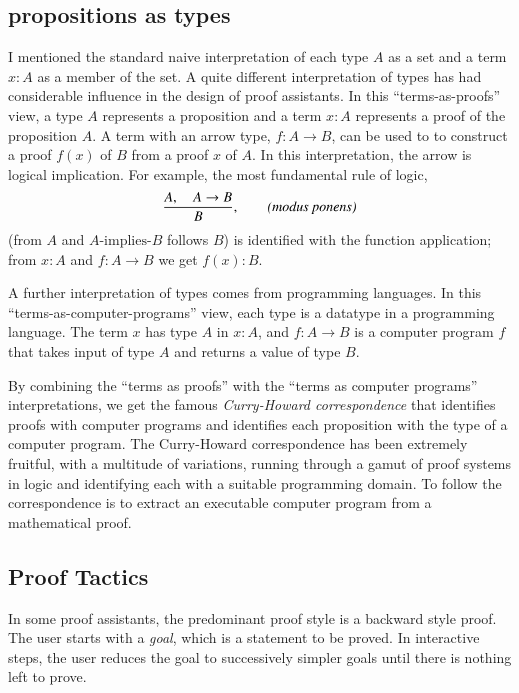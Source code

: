 \documentclass{llncs}
\begin{document}
\subsection{propositions as types}

I mentioned the standard naive interpretation of each type $A$ as a
set and a term $x:A$ as a member of the set.  A quite different
interpretation of types has had considerable influence in the design
of proof assistants.  In this ``terms-as-proofs'' view, a type $A$ represents a
proposition and a term $x:A$ represents a proof of the proposition
$A$.  A term with an arrow type, $f:A\rightarrow B$, can be used to to
construct a proof $f(x)$ of $B$ from a proof $x$ of $A$.  In this
interpretation, the arrow is logical implication. For example,  the most fundamental rule of logic,
\[
\frac{A,\quad A\rightarrow B}{B},  \qquad \text{\it(modus ponens)}
\]
(from $A$ and $A\text{-implies-}B$ follows $B$) is identified with the
function application; from $x:A$ and $f:A\rightarrow B$ we get
$f(x):B$.

A further interpretation of types comes from programming languages.
In this ``terms-as-computer-programs'' view, each type is a datatype
in a programming language.  The term $x$ has type $A$ in $x:A$, and
$f:A\rightarrow B$ is a computer program $f$ that takes input of type
$A$ and returns a value of type $B$.

By combining the ``terms as proofs'' with the ``terms as computer
programs'' interpretations, we get the famous {\it Curry-Howard
  correspondence} that identifies proofs with computer programs and
identifies each proposition with the type of a computer program.  The
Curry-Howard correspondence has been extremely fruitful, with a
multitude of variations, running through a gamut of proof systems in
logic and identifying each with a suitable programming domain.  To follow
the correspondence is to extract an
executable computer program from a mathematical proof.






\subsection{Proof Tactics}

In some proof assistants, the predominant proof style is a backward style
proof.  The user starts with a {\it goal}, which is a statement to be proved. In
interactive steps, the user reduces the goal to successively
simpler goals until there is nothing left to prove.
\end{document}
